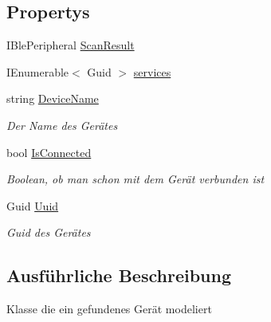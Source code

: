 \subsection*{Propertys}
\begin{DoxyCompactItemize}
\item 
I\+Ble\+Peripheral \mbox{\hyperlink{classmy_m_d_1_1_view_model_1_1_send_data_tab_view_model_1_1_scan_result_view_model_a4dca1edb74b6b85465047896f464eb98}{Scan\+Result}}
\item 
I\+Enumerable$<$ Guid $>$ \mbox{\hyperlink{classmy_m_d_1_1_view_model_1_1_send_data_tab_view_model_1_1_scan_result_view_model_aa2d370aaf242496dcf429de8983dd6c3}{services}}
\item 
string \mbox{\hyperlink{classmy_m_d_1_1_view_model_1_1_send_data_tab_view_model_1_1_scan_result_view_model_a5fa7aaa6ca6d8d48917014cf1f99c091}{Device\+Name}}
\begin{DoxyCompactList}\small\item\em Der Name des Gerätes \end{DoxyCompactList}\item 
bool \mbox{\hyperlink{classmy_m_d_1_1_view_model_1_1_send_data_tab_view_model_1_1_scan_result_view_model_a24eabbd36d43371c325d58b12c64c19f}{Is\+Connected}}
\begin{DoxyCompactList}\small\item\em Boolean, ob man schon mit dem Gerät verbunden ist \end{DoxyCompactList}\item 
Guid \mbox{\hyperlink{classmy_m_d_1_1_view_model_1_1_send_data_tab_view_model_1_1_scan_result_view_model_a85f6973e1fc06fbbf200988d583fdb01}{Uuid}}
\begin{DoxyCompactList}\small\item\em Guid des Gerätes \end{DoxyCompactList}\end{DoxyCompactItemize}


\subsection{Ausführliche Beschreibung}
Klasse die ein gefundenes Gerät modeliert 



